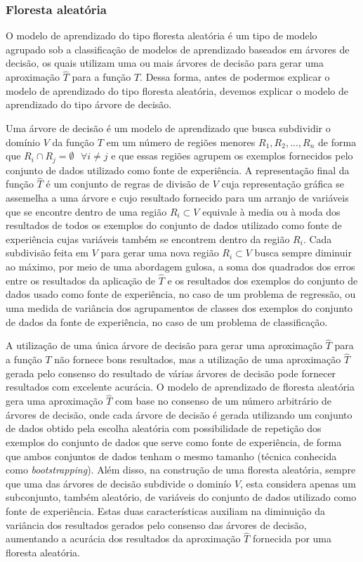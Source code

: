 \subsubsection{Floresta aleatória}

O modelo de aprendizado do tipo floresta aleatória é um tipo de modelo agrupado sob a classificação de modelos de aprendizado baseados em árvores de decisão, os quais utilizam uma ou mais árvores de decisão para gerar uma aproximação $\hat{T}$ para a função $T$. Dessa forma, antes de podermos explicar o modelo de aprendizado do tipo floresta aleatória, devemos explicar o modelo de aprendizado do tipo árvore de decisão.

Uma árvore de decisão é um modelo de aprendizado que busca subdividir o domínio $V$ da função $T$ em um número de regiões menores $R_{1}, R_{2}, ..., R_{n}$ de forma que $R_{i} \cap R_{j} = \emptyset \text{ } \forall i \ne j$ e que essas regiões agrupem os exemplos fornecidos pelo conjunto de dados utilizado como fonte de experiência. A representação final da função $\hat{T}$ é um conjunto de regras de divisão de $V$ cuja representação gráfica se assemelha a uma árvore e cujo resultado fornecido para um arranjo de variáveis que se encontre dentro de uma região $R_{i} \subset V$ equivale à media ou à moda dos resultados de todos os exemplos do conjunto de dados utilizado como fonte de experiência cujas variáveis também se encontrem dentro da região $R_{i}$\cite[p.303]{statistical_learning}. Cada subdivisão feita em $V$ para gerar uma nova região $R_{i} \subset V$ busca sempre diminuir ao máximo, por meio de uma abordagem gulosa, a soma dos quadrados dos erros entre os resultados da aplicação de $\hat{T}$ e os resultados dos exemplos do conjunto de dados usado como fonte de experiência, no caso de um problema de regressão, ou uma medida de variância dos agrupamentos de classes dos exemplos do conjunto de dados da fonte de experiência, no caso de um problema de classificação\cite[p.306-307, 312]{statistical_learning}.

A utilização de uma única árvore de decisão para gerar uma aproximação $\hat{T}$ para a função $T$ não fornece bons resultados, mas a utilização de uma aproximação $\hat{T}$ gerada pelo consenso do resultado de várias árvores de decisão pode fornecer resultados com excelente acurácia\cite[p.303]{statistical_learning}. O modelo de aprendizado de floresta aleatória gera uma aproximação $\hat{T}$ com base no consenso de um número arbitrário de árvores de decisão, onde cada árvore de decisão é gerada utilizando um conjunto de dados obtido pela escolha aleatória com possibilidade de repetição dos exemplos do conjunto de dados que serve como fonte de experiência, de forma que ambos conjuntos de dados tenham o mesmo tamanho (técnica conhecida como \textit{bootstrapping}). Além disso, na construção de uma floresta aleatória, sempre que uma das árvores de decisão subdivide o dominío $V$, esta considera apenas um subconjunto, também aleatório, de variáveis do conjunto de dados utilizado como fonte de experiência. Estas duas características auxiliam na diminuição da variância dos resultados gerados pelo consenso das árvores de decisão, aumentando a acurácia dos resultados da aproximação $\hat{T}$ fornecida por uma floresta aleatória\cite[p.316-321]{statistical_learning}.

